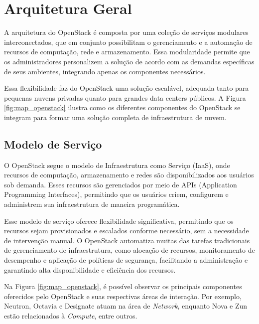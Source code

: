\section{Arquitetura Geral}

A arquitetura do OpenStack é composta por uma coleção de serviços modulares interconectados, que em conjunto possibilitam o gerenciamento e a automação de recursos de computação, rede e armazenamento. Essa modularidade permite que os administradores personalizem a solução de acordo com as demandas específicas de seus ambientes, integrando apenas os componentes necessários.

Essa flexibilidade faz do OpenStack uma solução escalável, adequada tanto para pequenas nuvens privadas quanto para grandes data centers públicos. A Figura \ref{fig:map_openstack} ilustra como os diferentes componentes do OpenStack se integram para formar uma solução completa de infraestrutura de nuvem.

\subsection{Modelo de Serviço}
O OpenStack segue o modelo de Infraestrutura como Serviço (IaaS), onde recursos de computação, armazenamento e redes são disponibilizados aos usuários sob demanda. Esses recursos são gerenciados por meio de APIs (Application Programming Interfaces), permitindo que os usuários criem, configurem e administrem sua infraestrutura de maneira programática.

Esse modelo de serviço oferece flexibilidade significativa, permitindo que os recursos sejam provisionados e escalados conforme necessário, sem a necessidade de intervenção manual. O OpenStack automatiza muitas das tarefas tradicionais de gerenciamento de infraestrutura, como alocação de recursos, monitoramento de desempenho e aplicação de políticas de segurança, facilitando a administração e garantindo alta disponibilidade e eficiência dos recursos.

Na Figura \ref{fig:map_openstack}, é possível observar os principais componentes oferecidos pelo OpenStack e suas respectivas áreas de interação. Por exemplo, Neutron, Octavia e Designate atuam na área de \textit{Network}, enquanto Nova e Zun estão relacionados à \textit{Compute}, entre outros.


